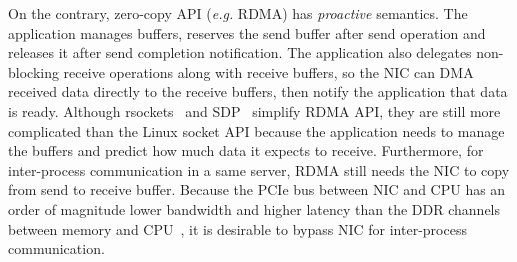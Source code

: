 On the contrary, zero-copy API (\textit{e.g.} RDMA) has \textit{proactive} semantics. The application manages buffers, reserves the send buffer after send operation and releases it after send completion notification. The application also delegates non-blocking receive operations along with receive buffers, so the NIC can DMA received data directly to the receive buffers, then notify the application that data is ready. Although rsockets~\cite{rsockets} and SDP~\cite{socketsdirect} simplify RDMA API, they are still more complicated than the Linux socket API because the application needs to manage the buffers and predict how much data it expects to receive. Furthermore, for inter-process communication in a same server, RDMA still needs the NIC to copy from send to receive buffer. Because the PCIe bus between NIC and CPU has an order of magnitude lower bandwidth and higher latency than the DDR channels between memory and CPU~\cite{li2017kv}, it is desirable to bypass NIC for inter-process communication.
